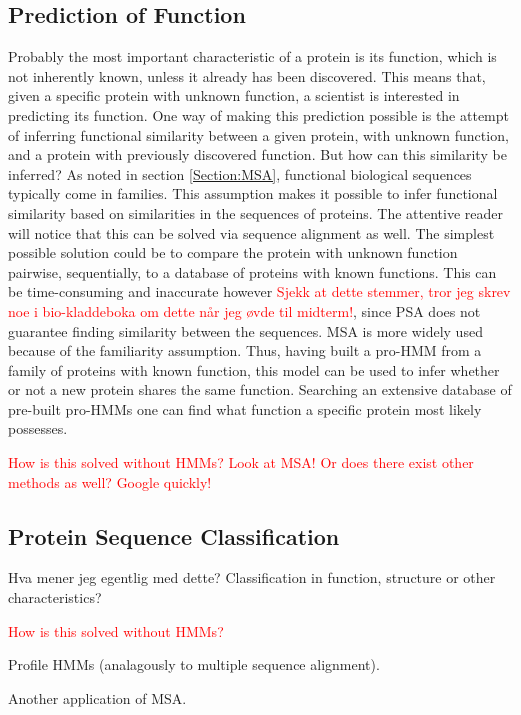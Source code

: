 \documentclass{article}\usepackage[]{graphicx}\usepackage[]{color}
\begin{document}
\subsection{Prediction of Function}\label{Section:ProtPredFunc}
Probably the most important characteristic of a protein is its function, which is not inherently known, unless it already has been discovered. This means that, given a specific protein with unknown function, a scientist is interested in predicting its function. One way of making this prediction possible is the attempt of inferring functional similarity between a given protein, with unknown function, and a protein with previously discovered function. But how can this similarity be inferred? As noted in section \ref{Section:MSA}, functional biological sequences typically come in families. This assumption makes it possible to infer functional similarity based on similarities in the sequences of proteins. The attentive reader will notice that this can be solved via sequence alignment as well. The simplest possible solution could be to compare the protein with unknown function pairwise, sequentially, to a database of proteins with known functions. This can be time-consuming and inaccurate however \textcolor{red}{Sjekk at dette stemmer, tror jeg skrev noe i bio-kladdeboka om dette når jeg øvde til midterm!}, since PSA does not guarantee finding similarity between the sequences. MSA is more widely used because of the familiarity assumption. Thus, having built a pro-HMM from a family of proteins with known function, this model can be used to infer whether or not a new protein shares the same function. Searching an extensive database of pre-built pro-HMMs one can find what function a specific protein most likely possesses.

\textcolor{red}{How is this solved without HMMs? Look at MSA! Or does there exist other methods as well? Google quickly!}

\subsection{Protein Sequence Classification}\label{Section:ProtSeqClass}
Hva mener jeg egentlig med dette? Classification in function, structure or other characteristics?

\textcolor{red}{How is this solved without HMMs?}

Profile HMMs (analagously to multiple sequence alignment). 

Another application of MSA.
\end{document}
